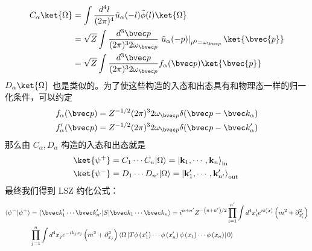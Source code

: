 \begin{equation} \begin{aligned}
C_\alpha\ket{\Omega}&=\int \frac{d^4 {l}}{(2\pi)^4} \tilde{u}_\alpha(-l)\tilde{\phi}(l)\ket{\Omega}\\
&=\sqrt{Z}\int \frac{d^3{\bvec p}}{(2\pi)^3 2\omega_{\bvec p}} \left.\tilde{u}_\alpha(-p)
\right|_{p^0=\omega_{\bvec p}} \ket{\bvec{p}}\\
&=\sqrt{Z}\int \frac{d^3{\bvec p}}{(2\pi)^3 2\omega_{\bvec p}} f_\alpha(\bvec p) \ket{\bvec{p}}
\end{aligned}\end{equation}
$D_\alpha\ket{\Omega}$ 也是类似的。为了使这些构造的入态和出态具有和物理态一样的归一化条件，可以约定
\begin{equation} \begin{aligned}
&f_\alpha(\bvec p)=Z^{-1/2}(2\pi)^3 2\omega_{\bvec p}\delta(\bvec p-\bvec k_\alpha)\\
&f'_\alpha(\bvec p)=Z^{-1/2}(2\pi)^3 2\omega_{\bvec p}\delta(\bvec p-\bvec k'_\alpha)
\end{aligned}\end{equation}
那么由 $C_\alpha,D_\alpha$ 构造的入态和出态就是
\begin{equation} \begin{aligned}
\ket{\psi^+} &=C_1 \cdots C_n|\Omega\rangle=\left|\mathbf{k}_1, \cdots, \mathbf{k}_n\right\rangle_{\text {in }} \\
\ket{\psi^-} &=D_1 \cdots D_{n'}|\Omega\rangle=\left|\mathbf{k}_1^{\prime}, \cdots, \mathbf{k}_{n'}^{\prime}\right\rangle_{\text {out }}
\end{aligned}\end{equation}
最终我们得到 LSZ 约化公式：
\begin{equation} \begin{aligned}
\langle\psi^-|\psi^+\rangle&=\langle\bvec k'_1 \cdots \bvec k'_{n'}|S|\bvec k_1\cdots\bvec k_n\rangle= i^{n+n'} Z^{-\left(n+n'\right) / 2}
\prod_{i=1}^{n'}\int d^4 {x_i'} e^{i k_i' x_i'}\left(m^2+\partial_{x_i'}^2\right)  \\
& \prod_{j=1}^n\int d^4  x_j e^{-i k_j x_j}\left(m^2+\partial_{x_j}^2\right)
\left\langle \Omega\left|T \phi\left(x_1'\right) \cdots \phi\left(x_n'\right) \phi\left(x_{1}\right) \cdots \phi\left(x_{n}\right)\right| 0\right\rangle
\end{aligned}\end{equation} 